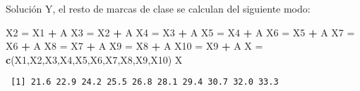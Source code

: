 \documentclass[
  ignorenonframetext,
]{beamer}
\newenvironment{Shaded}{\begin{snugshade}}{\end{snugshade}}
\newcommand{\KeywordTok}[1]{\textcolor[rgb]{0.13,0.29,0.53}{\textbf{#1}}}
\newcommand{\NormalTok}[1]{#1}
\newcommand{\OperatorTok}[1]{\textcolor[rgb]{0.81,0.36,0.00}{\textbf{#1}}}
\newcommand{\StringTok}[1]{\textcolor[rgb]{0.31,0.60,0.02}{#1}}
\begin{document}
\begin{frame}[fragile]{Solución}
\protect\hypertarget{soluciuxf3n-9}{}
Y, el resto de marcas de clase se calculan del siguiente modo:

\begin{Shaded}
\begin{Highlighting}[]
\NormalTok{X2 =}\StringTok{ }\NormalTok{X1 }\OperatorTok{+}\StringTok{ }\NormalTok{A}
\NormalTok{X3 =}\StringTok{ }\NormalTok{X2 }\OperatorTok{+}\StringTok{ }\NormalTok{A}
\NormalTok{X4 =}\StringTok{ }\NormalTok{X3 }\OperatorTok{+}\StringTok{ }\NormalTok{A}
\NormalTok{X5 =}\StringTok{ }\NormalTok{X4 }\OperatorTok{+}\StringTok{ }\NormalTok{A}
\NormalTok{X6 =}\StringTok{ }\NormalTok{X5 }\OperatorTok{+}\StringTok{ }\NormalTok{A}
\NormalTok{X7 =}\StringTok{ }\NormalTok{X6 }\OperatorTok{+}\StringTok{ }\NormalTok{A}
\NormalTok{X8 =}\StringTok{ }\NormalTok{X7 }\OperatorTok{+}\StringTok{ }\NormalTok{A}
\NormalTok{X9 =}\StringTok{ }\NormalTok{X8 }\OperatorTok{+}\StringTok{ }\NormalTok{A}
\NormalTok{X10 =}\StringTok{ }\NormalTok{X9 }\OperatorTok{+}\StringTok{ }\NormalTok{A}
\NormalTok{X =}\StringTok{ }\KeywordTok{c}\NormalTok{(X1,X2,X3,X4,X5,X6,X7,X8,X9,X10)}
\NormalTok{X}
\end{Highlighting}
\end{Shaded}

\begin{verbatim}
 [1] 21.6 22.9 24.2 25.5 26.8 28.1 29.4 30.7 32.0 33.3
\end{verbatim}
\end{frame}
\end{document}
